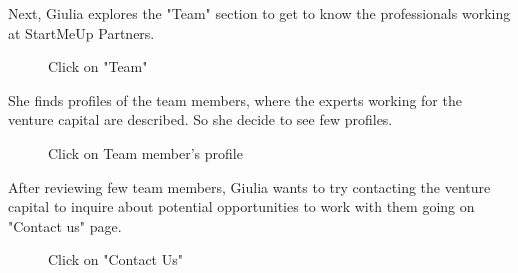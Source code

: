 \documentclass[11pt, letterpaper]{article}
\begin{document}
\noindent
Next, Giulia explores the "Team" section to get to know the professionals working at StartMeUp Partners.
\begin{figure}[H]
    \centering
    \setlength{\fboxsep}{0pt}
    \caption{Click on "Team"}
    \label{fig:scenario2_4}
\end{figure}
\noindent
She finds profiles of the team members, where the experts working for the venture capital are described. So she decide to see few profiles.
\begin{figure}[H]
    \centering
    \setlength{\fboxsep}{0pt}
    \caption{Click on Team member's profile}
    \label{fig:scenario2_5}
\end{figure}
\noindent
After reviewing few team members, Giulia wants to try contacting the venture capital to inquire about potential opportunities to work with them going on "Contact us" page.
\begin{figure}[H]
    \centering
    \setlength{\fboxsep}{0pt}
    \caption{Click on "Contact Us"}
    \label{fig:scenario2_6}
\end{figure}
\end{document}
